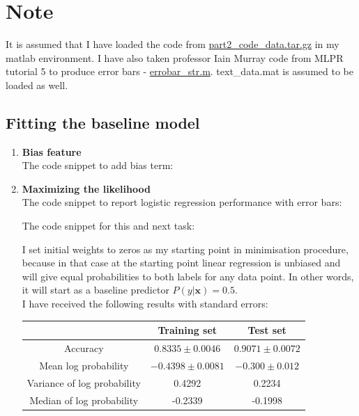 \documentclass{article}
\newcommand{\vect}[1]{\boldsymbol{#1}} %
\begin{document}
			\section*{Note}
				It is assumed that I have loaded the code from \href{http://www.inf.ed.ac.uk/teaching/courses/mlpr/2015/assignment/part2_code_data.tar.gz}{part2\_code\_data.tar.gz} in my matlab environment. I have also taken professor Iain Murray code from MLPR tutorial 5 to produce error bars - \href{http://homepages.inf.ed.ac.uk/imurray2/code/imurray-matlab/errorbar_str.m}{errobar\_str.m}. text\_data.mat is assumed to be loaded as well.
			\subsection{Fitting the baseline model}
				\begin{enumerate}[label=(\alph*)]
					\item
						\textbf{Bias feature} \\
						The code snippet to add bias term:
						
					\item
						\textbf{ Maximizing the likelihood} \\
						The code snippet to report logistic regression performance with error bars:
						
						The code snippet for this and next task:
						
						I set initial weights to zeros as my starting point in minimisation procedure, because in that case at the starting point linear regression is unbiased and will give equal probabilities to both labels for any data point. In other words,  it will start as a baseline predictor $P(y | \vect{x}) = 0.5$.\\
						I have received the following results with standard errors:
						\begin{center}
							\begin{tabular}{| c | c | c |}
								\hline
								\, &  Training set & Test set \\ 
								\hline
								Accuracy                  & $0.8335 \pm 0.0046$ & $0.9071 \pm 0.0072$ \\ 
								\hline
								Mean log probability &$-0.4398 \pm 0.0081$ & $-0.300  \pm 0.012 $ \\
								\hline
								Variance of log probability & 0.4292 & 0.2234 \\
								\hline
								Median of log probability  & -0.2339 & -0.1998 \\
								\hline

\end{tabular}
\end{center}
\end{enumerate}
\end{document}
